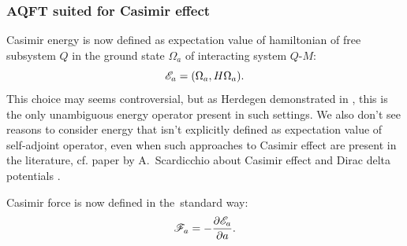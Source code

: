 \documentclass[10pt,t]{beamer}
\begin{document}
\begin{frame}
  \frametitle{AQFT suited for Casimir effect}


  Casimir energy is now defined as expectation value of  hamiltonian of
  \alert{free} subsystem $Q$ in the ground state $\Omega_{ a }$ of interacting
  system $Q\text{-}M$:
  \begin{equation}
    \label{eq:Overview-of-Herdegens-approach-ETC-06}
    \mathcal{E}_{ a } = ( \Omega_{ a }, H \Omega_{ a } ).
  \end{equation}
  This choice may seems controversial, but as Herdegen demonstrated in
  \parencite{Herdegen-Quantum-backreaction-ETC-Part-I-Pub-2005}, this is
  the only unambiguous energy operator present in such settings. We also
  don't see reasons to consider energy that isn't explicitly defined as
  expectation value of self-adjoint operator, even when such approaches to
  Casimir effect are present in the literature, cf. paper by A.~Scardicchio
  about Casimir effect and Dirac delta potentials
  \parencite{Scardicchio-Casimir-dynamics-ETC-2005}.

  Casimir force is now defined in the~standard way:
  \begin{equation}
    \label{eq:Overview-of-Herdegens-approach-ETC-07}
    \mathcal{F}_{ a } = -\frac{ \partial \mathcal{E}_{ a } }{ \partial a }.
  \end{equation}

\end{frame}














\end{document}
